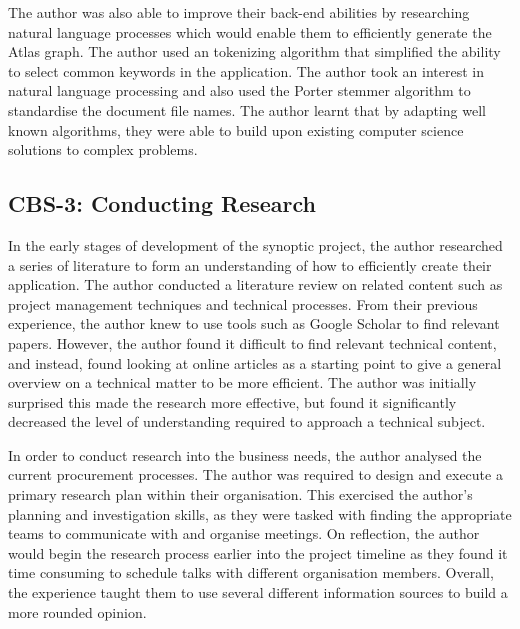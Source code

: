 \documentclass{article}
\begin{document}
The author was also able to improve their back-end abilities by researching natural language processes which would enable them to efficiently generate the Atlas graph. The author used an tokenizing algorithm that simplified the ability to select common keywords in the application. The author took an interest in natural language processing and also used the Porter stemmer algorithm to standardise the document file names. The author learnt that by adapting well known algorithms, they were able to build upon existing computer science solutions to complex problems. 

\subsection{CBS-3: Conducting Research}

In the early stages of development of the synoptic project, the author researched a series of literature to form an understanding of how to efficiently create their application. The author conducted a literature review on related content such as project management techniques and technical processes. From their previous experience, the author knew to use tools such as Google Scholar to find relevant papers. However, the author found it difficult to find relevant technical content, and instead, found looking at online articles as a starting point to give a general overview on a technical matter to be more efficient. The author was initially surprised this made the research more effective, but found it significantly decreased the level of understanding required to approach a technical subject.

In order to conduct research into the business needs, the author analysed the current procurement processes. The author was required to design and execute a primary research plan within their organisation. This exercised the author's planning and investigation skills, as they were tasked with finding the appropriate teams to communicate with and organise meetings. On reflection, the author would begin the research process earlier into the project timeline as they found it time consuming to schedule talks with different organisation members. Overall, the experience taught them to use several different information sources to build a more rounded opinion.

\newpage
\end{document}
